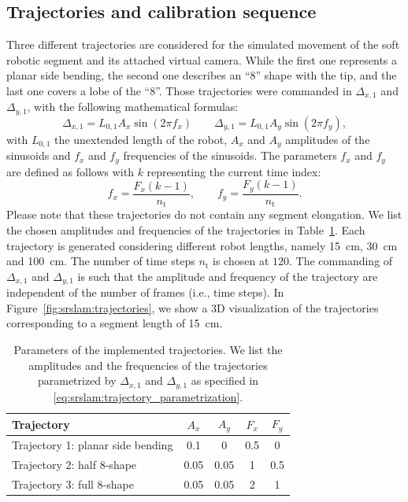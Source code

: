 \subsection{Trajectories and calibration sequence}\label{sub:srslam:trajectories}
Three different trajectories are considered for the simulated movement of the soft robotic segment and its attached virtual camera. While the first one represents a planar side bending, the second one describes an “8” shape with the tip, and the last one covers a lobe of the “8”. 
Those trajectories were commanded in $\Delta_{x,1}$ and $\Delta_{y,1}$, with the following mathematical formulas:
\begin{equation}\label{eq:srslam:trajectory_parametrization}
    \Delta_{x,1} = L_{0,1} A_x \sin(2 \pi f_x) \qquad \Delta_{y,1} = L_{0,1} A_y \sin(2 \pi f_y),
\end{equation}
with $L_{0,1}$ the unextended length of the robot, $A_x$ and $A_y$ amplitudes of the sinusoids and $f_x$ and $f_y$ frequencies of the sinusoids.
The parameters $f_x$ and $f_y$ are defined as follows with $k$ representing the current time index:
\begin{equation}
    f_x = \frac{F_x (k-1)}{n_{\mathrm{t}}}, \qquad f_y = \frac{F_y (k-1)}{n_{\mathrm{t}}}.
\end{equation}
Please note that these trajectories do not contain any segment elongation. 
We list the chosen amplitudes and frequencies of the trajectories in Table~\ref{tab:srslam:trajectory_params}. Each trajectory is generated considering different robot lengths, namely \SI{15}{cm}, \SI{30}{cm} and \SI{100}{cm}. The number of time steps $n_{\mathrm{t}}$ is chosen at $120$. 
The commanding of $\Delta_{x,1}$ and $\Delta_{y,1}$ is such that the amplitude and frequency of the trajectory are independent of the number of frames (i.e., time steps).
In Figure~\ref{fig:srslam:trajectories}, we show a 3D visualization of the trajectories corresponding to a segment length of \SI{15}{cm}.

\begin{table}
\centering
\caption{Parameters of the implemented trajectories. We list the amplitudes and the frequencies of the trajectories parametrized by $\Delta_{x,1}$ and $\Delta_{y,1}$ as specified in \eqref{eq:srslam:trajectory_parametrization}.}
\begin{tabular}{lcccc}\toprule
\textbf{Trajectory} & $A_x$ & $A_y$ & $F_x$ & $F_y$\\
\midrule
Trajectory 1: planar side bending & 0.1 & 0 & 0.5 & 0\\
Trajectory 2: half 8-shape & 0.05 & 0.05 & 1 & 0.5\\
Trajectory 3: full 8-shape & 0.05 & 0.05 & 2 & 1\\
\bottomrule
\end{tabular}
\label{tab:srslam:trajectory_params}
\end{table}

